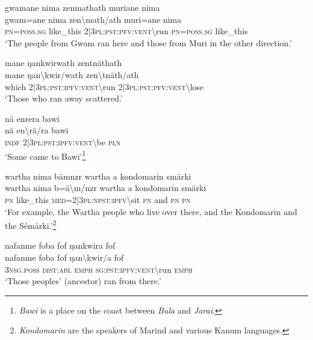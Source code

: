 \ea\label{ex:1:a3591}
gwamane nima zenmathath muriane nima\\
\gll gwam=ane	nima	zen{\textbackslash}math/ath	muri=ane	nima\\
     \textsc{pn}=\textsc{poss}.\textsc{sg}	like\_this	2|3\textsc{pl}:\textsc{pst}:\textsc{pfv}:\textsc{vent}{\textbackslash}run	\textsc{pn}=\textsc{poss}.\textsc{sg}	like\_this\\
\glt `The people from Gwam ran here and those from Muri in the other direction.'
\z

\ea\label{ex:1:a3593}
mane ŋankwirwath zentnäthath\\
\gll mane	ŋan{\textbackslash}kwir/wath	zen{\textbackslash}tnäth/ath\\
     which	2|3\textsc{pl}:\textsc{pst}:\textsc{ipfv}:\textsc{vent}{\textbackslash}run	2|3\textsc{pl}:\textsc{pst}:\textsc{pfv}:\textsc{vent}{\textbackslash}lose\\
\glt `Those who ran away scattered.'
\z

\ea\label{ex:1:a3594}
nä enrera bawi\\
\gll nä	en{\textbackslash}rä/ra	bawi\\
     \textsc{indf}	2|3\textsc{pl}:\textsc{pst}:\textsc{ipfv}:\textsc{vent}{\textbackslash}be	\textsc{pln}\\
\glt `Some came to Bawi'\footnote{\textit{Bawi} is a place on the coast between \textit{Bula} and \textit{Jarai}.}
\z

\ea\label{ex:1:a3595}
wartha nima bämnzr wartha a kondomarin smärki\\
\gll wartha	nima	b=ä{\textbackslash}m/nzr	wartha	a	kondomarin	smärki\\
     \textsc{pn}	like\_this	\textsc{med}=2|3\textsc{pl}:\textsc{npst}:\textsc{ipfv}{\textbackslash}sit	\textsc{pn}	and	\textsc{pn}	\textsc{pn}\\
\glt `For example, the Wartha people who live over there, and the Kondomarin and the Sémärki.'\footnote{\textit{Kondomarin} are the speakers of Marind and various Kanum languages.}
\z

\ea\label{ex:1:a3599}
nafanme foba fof ŋankwira fof\\
\gll nafanme	foba	fof	ŋan{\textbackslash}kwir/a	fof\\
     3\textsc{nsg}.\textsc{poss}	\textsc{dist}:\textsc{abl}	\textsc{emph}	\textsc{sg}:\textsc{pst}:\textsc{ipfv}:\textsc{vent}{\textbackslash}run	\textsc{emph}\\
\glt `Those peoples' (ancestor) ran from there.'
\z

